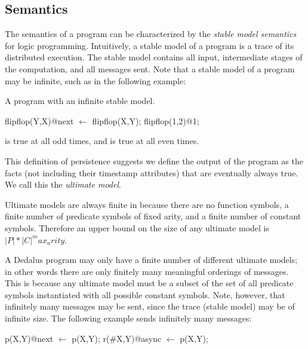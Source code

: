 \subsection{Semantics}
The semantics of a \lang program can be characterized by the {\em stable model semantics}  for logic programming.  Intuitively, a stable model of a \lang program is a trace of its distributed execution.  The stable model contains all input, intermediate stages of the computation, and all messages sent.  Note that a stable model of a \lang program may be infinite, such as in the following example:

\begin{example}
A \lang program with an infinite stable model.

\begin{Dedalus}
flipflop(Y,X)@next \(\leftarrow\) flipflop(X,Y);
flipflop(1,2)@1;
\end{Dedalus}
\end{example}

 is true at all odd times, and  is true at all even times.

This definition of persistence suggests we define the output of the program as the facts (not including their timestamp attributes) that are eventually always true.  We call this the {\em ultimate model}.

Ultimate models are always finite in \dedalus because there are no function symbols, a finite number of predicate symbols of fixed arity, and a finite number of constant symbols.  Therefore an upper bound on the size of any ultimate model is $|P| * |C| ^ max_arity$.

A Dedalus program may only have a finite number of different ultimate models; in other words there are only finitely many meaningful orderings of messages.  This is because any ultimate model must be a subset of the set of all predicate symbols instantiated with all possible constant symbols.  Note, however, that infinitely many messages may be sent, since the trace (stable model) may be of infinite size.  The following example sends infinitely many messages:

\begin{example}
\begin{Dedalus}
p(X,Y)@next \(\leftarrow\) p(X,Y);
r(#X,Y)@async \(\leftarrow\) p(X,Y);
\end{Dedalus}
\end{example}

